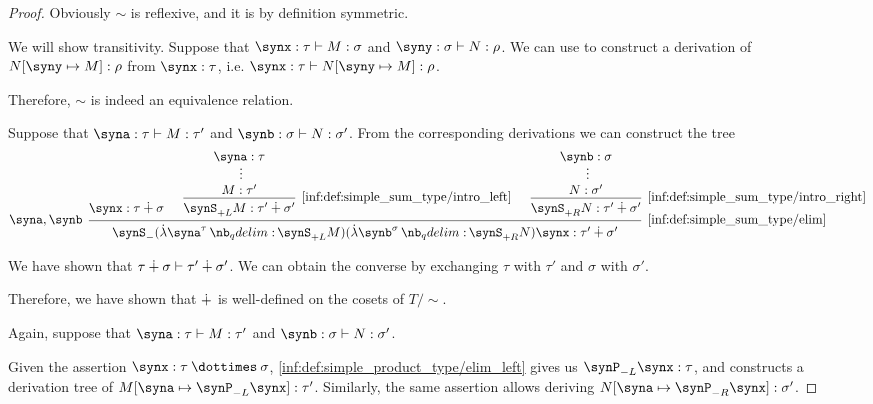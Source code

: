 \begin{proof}
   Obviously \( {\sim} \) is reflexive, and it is by definition symmetric.

  We will show transitivity. Suppose that \( \synx: \tau \vdash M: \sigma \) and \( \syny: \sigma \vdash N: \rho \). We can use  to construct a derivation of \( N[\syny \mapsto M]: \rho \) from \( \synx: \tau \), i.e. \( \synx: \tau \vdash N[\syny \mapsto M]: \rho \).

  Therefore, \( {\sim} \) is indeed an equivalence relation.

   Suppose that \( \syna: \tau \vdash M: \tau' \) and \( \synb: \sigma \vdash N: \sigma' \). From the corresponding derivations we can construct the tree
  \begin{equation*}
    \begin{prooftree}
      \hypo{ \synx: \tau \synplus \sigma }

      \hypo{ \syna: \tau }
      \ellipsis {} { M: \tau' }
      \infer1[\ref{inf:def:simple_sum_type/intro_left}]{ \synS_{+L} M: \tau' \synplus \sigma' }

      \hypo{ \synb: \sigma }
      \ellipsis {} { N: \sigma' }
      \infer1[\ref{inf:def:simple_sum_type/intro_right}]{ \synS_{+R} N: \tau' \synplus \sigma' }

      \infer[left label={\( \syna, \synb \)}]3[\ref{inf:def:simple_sum_type/elim}]{ \synS_- (\qabs {\syna^\tau} \synS_{+L} M) (\qabs {\synb^{\sigma}} \synS_{+R} N) \synx: \tau' \synplus \sigma' }
    \end{prooftree}
  \end{equation*}

  We have shown that \( \tau \mathbin{\dotplus} \sigma \vdash \tau' \mathbin{\dotplus} \sigma' \). We can obtain the converse by exchanging \( \tau \) with \( \tau' \) and \( \sigma \) with \( \sigma' \).

  Therefore, we have shown that \( {\mathbin{\dotplus}} \) is well-defined on the cosets of \( T / {\sim} \).

   Again, suppose that \( \syna: \tau \vdash M: \tau' \) and \( \synb: \sigma \vdash N: \sigma' \).

  Given the assertion \( \synx: \tau \syntimes \sigma \), \ref{inf:def:simple_product_type/elim_left} gives us \( \synP_{-L} \synx: \tau \), and  constructs a derivation tree of \( M[\syna \mapsto \synP_{-L} \synx]: \tau' \). Similarly, the same assertion allows deriving \( N[\syna \mapsto \synP_{-R} \synx]: \sigma' \).


\end{proof}
